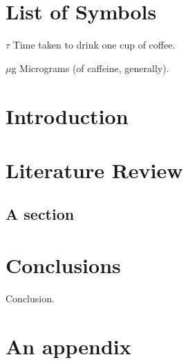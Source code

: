 \documentclass[edeposit,fullpage]{uiucthesis2021}
\newcounter{counterforappendices}
\begin{document}
\chapter{List of Symbols}

\begin{symbollist}[0.7in]
\item[$\tau$] Time taken to drink one cup of coffee.
\item[$\mu$g] Micrograms (of caffeine, generally).
\end{symbollist}

\pagebreak

\mainmatter


\chapter{Introduction}


\chapter{Literature Review}
\section{A section}

\chapter{Conclusions}
Conclusion.

%
% 

\backmatter

\printbibliography[heading=bibintoc,title={References}]

\clearpage
\setcounter{counterforappendices}{\value{page}}
\mainmatter
\setcounter{page}{\value{counterforappendices}}

\appendix
\chapter{An appendix}

\end{document}

